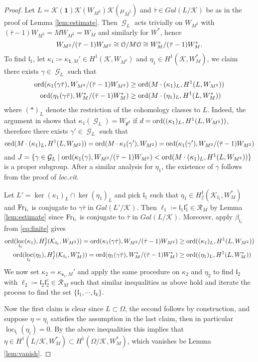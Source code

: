 \documentclass[leqno]{amsart}
\theoremstyle{definition}
\theoremstyle{remark}
\newcommand{\id}{\mathbf{1}}
\newcommand{\eo}{\EuScript{O}}
\DeclareMathOperator{\Gal}{\mathcal{G}}
\newcommand{\Fr}{\textnormal{Fr}} %
\newcommand{\fl}{\mathfrak{l}}
\newcommand{\fp}{\mathfrak{p}}
\newcommand{\fs}{\mathfrak{s}}
\newcommand{\K}{{\mathcal{K}}} %
\newcommand{\ord}{\textnormal{ord}} %
\DeclareMathOperator{\loc}{loc}
\begin{document}
\begin{proof}
Let $L=\K(\id)\K(W_{M^2})\K(\mu_{\bar{M}^2})$
and $\bar{\tau}\in Gal(L/\K)$ be as in the proof of Lemma \ref{lem:estimate}.
Then $\Gal_L$ acts trivially on $W_{M^2}$ with
$(\bar{\tau}-1)W_{M^2}=MW_{M^2}=W_M$ and similarly for $W^*$, hence
\[
    W_{M^2}/(\bar{\tau}-1)W_{M^2}\cong
    \eo/M\eo\cong
    W_{M}^*/(\bar{\tau}-1)W_{M}^*.
\]
To find $\fl_1$,
let $\kappa_1\coloneqq \kappa_{\id,M}'\in H^1(\K,W_{M^2})$ and
$\eta_{1}\in H^1(\K,W_{M}^*)$, we claim there exists
$\gamma\in \Gal_L$ such that 
\begin{align*}
	\ord(\kappa_1(\gamma\bar{\tau}),W_{M^2}/(\bar{\tau}-1)W_{M^2})&\geq
	\ord( M\cdot (\kappa_1)_L, H^1(L,W_{M^2}) )\\
	\ord(\eta_1(\gamma\bar{\tau}),W_{M}^*/(\bar{\tau}-1)W_{M}^*)&\geq
	\ord( M\cdot (\eta_1)_L, H^1(L,W_{M}^*) )
\end{align*}
where $(*)_L$ denote the restriction of the cohomology classes to $L$.
Indeed, the argument in \cite[Lem 5.2.1]{Rubin}
shows that $\kappa_1(\Gal_L)=W_{\fp^d}$ if 
$d=\ord( (\kappa_1)_L, H^1(L,W_{M^2}) )$,
therefore there exists $\gamma'\in \Gal_L$ such that 
\[
	\ord( M\cdot (\kappa_1)_L, H^1(L,W_{M^2}) )=
    \ord(M\cdot \kappa_1(\gamma'),W_{M^2})=
    \ord(\kappa_1(\gamma'),W_{M^2}/(\bar{\tau}-1)W_{M^2})
\]
and $J=\{\gamma\in\Gal_L\mid 
\ord(\kappa_1(\gamma),W_{M^2}/(\bar{\tau}-1)W_{M^2})<
\ord(M\cdot  (\kappa_1)_L, H^1(L,W_{M^2}) )\}$
is a proper subgroup.
After a similar analysis for $\eta_1$,
the existence of $\gamma$
follows from the proof of \textit{loc.cit}.

Let $L'=\ker(\kappa_1)_L\cap \ker(\eta_1)_L$
and pick $\fl_1$ such that 
$\eta_1\in H^1_f(\K_{\fl_1}, W_{M}^*)$ and
$\Fr_{\fl_i}$ is conjugate to 
$\gamma\bar{\tau}$ in $Gal(L'/\K)$.
Then $\ell_1\coloneqq \fl_1\fl_1^c\in \mathcal{R}_M$ 
by Lemma \ref{lem:estimate} since
$\Fr_{\fl_i}$ is conjugate to  $\bar{\tau}$ in $Gal(L/\K)$.
Moreover, apply $\beta_{\fl_1}$ from \eqref{eq:finite} gives
\begin{align*}
	\ord( \loc_{\fl_1}(\kappa_1), H^1_f(\K_{\fl_1},W_{M^2}))=
	\ord(\kappa_1(\gamma\bar{\tau}),W_{M^2}/(\bar{\tau}-1)W_{M^2})&\geq
	\ord( (\kappa_1)_L, H^1(L,W_{M^2}) )\\
	\ord( \loc_{\fl_1}(\eta_1), H^1_f(\K_{\fl_1},W_{M}^*))=
	\ord(\eta_1(\gamma\bar{\tau}),W_{M}^*/(\bar{\tau}-1)W_{M}^*)&\geq
	\ord( (\eta_1)_L, H^1(L,W_{M}^*) ) 
\end{align*}
We now set $\kappa_2=\kappa_{\fs_1,M}'$
and apply the same procedure on $\kappa_2$ and $\eta_2$
to find $\fl_2$ with
$\ell_2\coloneqq \fl_2\fl_2^c\in \mathcal{R}_M$ 
such that similar inequalities as above hold
and iterate the process to find 
the set $\{\fl_1,\cdots,\fl_k\}$.

Now the first claim is clear since $L\subset \Omega$,
the second follows by construction,
and suppose $\eta=\eta_i$ satisfies
the assumption in the last claim,
then in particular $\loc_{\fl_i}(\eta_i)=0$.
By the above inequalities this implies that
$\eta\in H^1(L/\K, W_{M}^*)\subset H^1(\Omega/\K, W_{M}^*)$,
which vanishes be Lemma \ref{lem:vanish}.

\end{proof}
\end{document}

